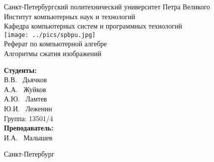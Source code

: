 \begin{titlepage}	%

	\begin{center}		%

		\large Санкт-Петербургский политехнический университет Петра Великого\\
		\large Институт компьютерных наук и технологий \\
		\large Кафедра компьютерных систем и программных технологий\\[1cm]
		
		\texttt{[image: ../pics/spbpu.jpg]}\\[2cm]
		
		\huge Реферат по компьютерной алгебре\\[0.5cm] %
		\huge Алгоритмы сжатия изображений\\[3cm]

	\end{center}	
	
	\begin{flushright} %
		\begin{minipage}{0.25\textwidth} %
			\begin{flushleft} %

				\large\textbf{Студенты:}\\
				\large В.В. ~Дьячков\\
				\large А.А. ~Жуйков\\
				\large А.Ю. ~Ламтев\\
				\large Ю.И. ~Леженин\\
				\large {Группа:} 13501/4\\
				
				\large \textbf{Преподаватель:}\\
				\large И.А. ~Малышев\\

			\end{flushleft}
		\end{minipage}
	\end{flushright}
	
	\vfill %

	\begin{center}
	\large Санкт-Петербург\\
	\large \the\year %
	\end{center} %
\thispagestyle{empty} %
\end{titlepage} %

\vfill %
